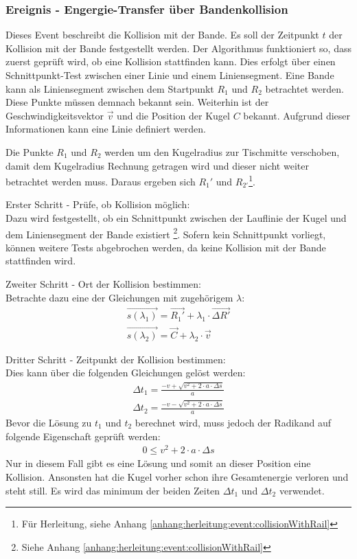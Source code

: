 \subsubsection{Ereignis - Engergie-Transfer über Bandenkollision}
Dieses Event beschreibt die Kollision mit der Bande. Es soll der Zeitpunkt $t$ der Kollision mit der Bande festgestellt werden.
Der Algorithmus funktioniert so, dass zuerst geprüft wird, ob eine Kollision stattfinden kann.
Dies erfolgt über einen Schnittpunkt-Test zwischen einer Linie und einem Liniensegment.
Eine Bande kann als Liniensegment zwischen dem Startpunkt $R_1$ und $R_2$ betrachtet werden. Diese Punkte müssen demnach bekannt sein.
Weiterhin ist der Geschwindigkeitsvektor $\vec{v}$ und die Position der Kugel $C$ bekannt.
Aufgrund dieser Informationen kann eine Linie definiert werden.

Die Punkte $R_1$ und $R_2$ werden um den Kugelradius zur Tischmitte verschoben,
damit dem Kugelradius Rechnung getragen wird und dieser nicht weiter betrachtet werden muss.
Daraus ergeben sich $R_1'$ und $R_{2'}$\footnote{Für Herleitung, siehe Anhang \ref{anhang:herleitung:event:collisionWithRail}}.

Erster Schritt - Prüfe, ob Kollision möglich:\\
Dazu wird festgestellt, ob ein Schnittpunkt zwischen der Lauflinie der Kugel und dem Liniensegment der
Bande existiert \footnote{Siehe Anhang \ref{anhang:herleitung:event:collisionWithRail}}.
Sofern kein Schnittpunkt vorliegt, können weitere Tests abgebrochen werden, da keine Kollision mit der Bande stattfinden wird.

Zweiter Schritt - Ort der Kollision bestimmen:\\
Betrachte dazu eine der Gleichungen mit zugehörigem $\lambda$:
\begin{align}
    \vec{s(\lambda_1)} = \vec{R_1'} + \lambda_1 \cdot \vec{\Delta R'}\\
    \vec{s(\lambda_2)} = \vec{C} + \lambda_2 \cdot \vec{v}
\end{align}

Dritter Schritt - Zeitpunkt der Kollision bestimmen:\\
Dies kann über die folgenden Gleichungen gelöst werden:
\begin{align}
    \Delta t_1 = \frac{-v + \sqrt{v^2 + 2 \cdot a \cdot \Delta s}}{a}\\
    \Delta t_2 = \frac{-v - \sqrt{v^2 + 2 \cdot a \cdot \Delta s}}{a}
\end{align}
Bevor die Lösung zu $t_1$ und $t_2$ berechnet wird, muss jedoch der Radikand auf folgende Eigenschaft geprüft werden:
\begin{align}
    0 \leq v^2 + 2 \cdot a \cdot \Delta s
\end{align}
Nur in diesem Fall gibt es eine Lösung und somit an dieser Position eine Kollision. Ansonsten hat die Kugel vorher schon
ihre Gesamtenergie verloren und steht still. Es wird das minimum der beiden Zeiten $\Delta t_1$ und $\Delta t_2$ verwendet.

